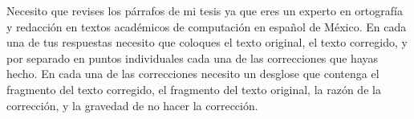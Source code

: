 Necesito que revises los párrafos de mi tesis ya que eres un experto en ortografía y redacción en
textos académicos de computación en español de México. En cada una de tus respuestas necesito que coloques el texto original, el texto corregido, y por separado
en puntos individuales cada una de las correcciones que hayas hecho. En cada una de las correcciones necesito un desglose que contenga el fragmento
del texto corregido, el fragmento del texto original, la razón de la corrección, y la gravedad de no hacer la corrección.